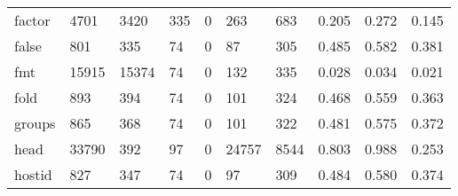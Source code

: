 \begin{longtable}{lp{2.0cm}p{2.0cm}p{2.0cm}p{2.0cm}p{2.0cm}p{2.0cm}p{2.0cm}p{2.0cm}p{2.0cm}}
factor    &                   4701 &                               3420 &                               335 &                                0 &                               263 &                             683 &                                   0.205 &                                  0.272 &                                0.145 \\
false     &                    801 &                                335 &                                74 &                                0 &                                87 &                             305 &                                   0.485 &                                  0.582 &                                0.381 \\
fmt       &                  15915 &                              15374 &                                74 &                                0 &                               132 &                             335 &                                   0.028 &                                  0.034 &                                0.021 \\
fold      &                    893 &                                394 &                                74 &                                0 &                               101 &                             324 &                                   0.468 &                                  0.559 &                                0.363 \\
groups    &                    865 &                                368 &                                74 &                                0 &                               101 &                             322 &                                   0.481 &                                  0.575 &                                0.372 \\
head      &                  33790 &                                392 &                                97 &                                0 &                             24757 &                            8544 &                                   0.803 &                                  0.988 &                                0.253 \\
hostid    &                    827 &                                347 &                                74 &                                0 &                                97 &                             309 &                                   0.484 &                                  0.580 &                                0.374 \\

\end{longtable}
